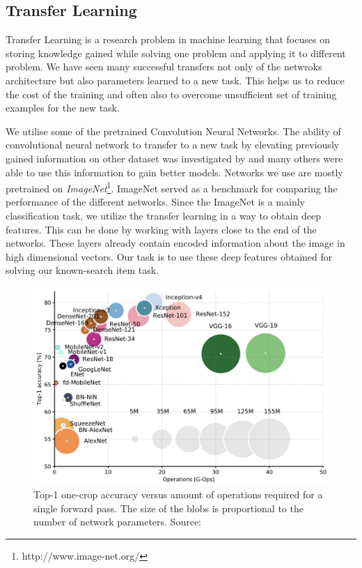 \subsection{Transfer Learning}

Transfer Learning is a research problem in machine learning that focuses on storing knowledge gained while solving one problem and applying it to different problem. We have seen many successful transfers not only of the netwroks architecture but also parameters learned to a new task. This helps us to reduce the cost of the training and often also to overcome unsufficient set of training examples for the new task.

We utilise some of the pretrained Convolution Neural Networks. The ability of convolutional neural network to transfer to a new task by elevating previously gained information on other dataset was investigated by \cite{donahuedeep} and many others were able to use this information to gain better models.  Networks we use are mostly pretrained on \emph{ImageNet}\footnote{http://www.image-net.org/}. ImageNet served as a benchmark for comparing the performance of the different networks. Since the ImageNet is a mainly classification task, we utilize the transfer learning in a way to obtain deep features. This can be done by working with layers close to the end of the networks. These layers already contain encoded information about the image in high dimensional vectors. Our task is to use these deep features obtained for solving our known-search item task.


\begin{figure}
    \centering
	\includegraphics[width=0.8\linewidth]{img/network-comparison.jpeg}
	\caption{Top-1 one-crop accuracy versus amount of operations required for a single forward pass. The size of the blobs is proportional to the number of network parameters. Source: \cite{canziani2016analysis}}
	\label{fig:camera-setup}
\end{figure}

